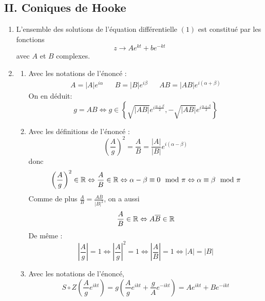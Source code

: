 \subsection*{II. Coniques de Hooke}
\begin{enumerate}
 \item L'ensemble des solutions de l'équation différentielle $(1)$ est constitué par les fonctions
\begin{displaymath}
 z \rightarrow Ae^{k t} + be^{-kt}
\end{displaymath}
avec $A$ et $B$ complexes.
\item \begin{enumerate}
 \item Avec les notations de l'énoncé :
\begin{align*}
 A=|A|e^{i\alpha} & & B=|B|e^{i\beta} & & AB=|AB|e^{i(\alpha +\beta)}
\end{align*}
On en déduit:
\begin{displaymath}
 g=AB \Leftrightarrow g\in \left\lbrace \sqrt{|AB|}e^{i\frac{\alpha+\beta}{2}}, -\sqrt{|AB|}e^{i\frac{\alpha+\beta}{2}}\right\rbrace 
\end{displaymath}

\item Avec les définitions de l'énoncé :
\begin{displaymath}
 \left(\dfrac{A}{g} \right)^2=\dfrac{A}{B}=\dfrac{|A|}{|B|}e^{i(\alpha - \beta)} 
\end{displaymath}
donc
\begin{displaymath}
 \left(\dfrac{A}{g} \right)^2 \in \mathbb{R} \Leftrightarrow \dfrac{A}{B}\in \mathbb{R}
\Leftrightarrow \alpha - \beta \equiv 0 \mod \pi
\Leftrightarrow \alpha \equiv \beta \mod \pi
\end{displaymath}
Comme de plus $\frac{A}{B}=\frac{A\overline{B}}{|B|^2}$, on a aussi 
\begin{displaymath}
 \dfrac{A}{B}\in \mathbb{R} \Leftrightarrow A\overline{B} \in \mathbb{R}
\end{displaymath}
De même :
\begin{displaymath}
 \left \vert \dfrac{A}{g}\right\vert=1 \Leftrightarrow
\left \vert \dfrac{A}{g}\right\vert ^2 =1 \Leftrightarrow
\left \vert \dfrac{A}{B}\right\vert =1 \Leftrightarrow |A|=|B|
\end{displaymath}

\item Avec les notations de l'énoncé,
\begin{displaymath}
 S\circ Z(\dfrac{A}{g}e^{ikt})=
g\left( \dfrac{A}{g}e^{ikt}+\dfrac{g}{A}e^{-ikt}\right)=
Ae^{ikt} + Be^{-ikt} 
\end{displaymath}
\end{enumerate}


\end{enumerate}
